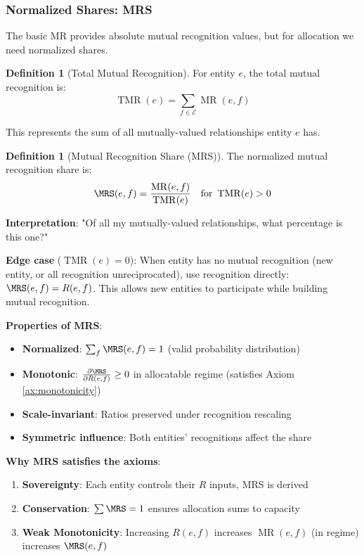 \documentclass[11pt,a4paper]{article}
\theoremstyle{definition}
\newtheorem{definition}[theorem]{Definition}
\theoremstyle{remark}
\newcommand{\E}{\mathcal{E}}
\DeclareMathOperator{\MR}{MR}
\DeclareMathOperator{\TMR}{TMR}
\begin{document}
\subsubsection{Normalized Shares: MRS}

The basic MR provides absolute mutual recognition values, but for allocation we need normalized shares.

\begin{definition}[Total Mutual Recognition]
For entity $e$, the total mutual recognition is:
\[ \TMR(e) = \sum_{f \in \E} \MR(e,f) \]

This represents the sum of all mutually-valued relationships entity $e$ has.
\end{definition}

\begin{definition}[Mutual Recognition Share (MRS)]
The normalized mutual recognition share is:
\[ \MRS(e,f) = \frac{\MR(e,f)}{\TMR(e)} \quad \text{for } \TMR(e) > 0 \]

\textbf{Interpretation}: "Of all my mutually-valued relationships, what percentage is this one?"

\textbf{Edge case} ($\TMR(e) = 0$): When entity has no mutual recognition (new entity, or all recognition unreciprocated), use recognition directly: $\MRS(e,f) = R(e,f)$. This allows new entities to participate while building mutual recognition.
\end{definition}

\textbf{Properties of MRS}:
\begin{itemize}
\item \textbf{Normalized}: $\sum_f \MRS(e,f) = 1$ (valid probability distribution)
\item \textbf{Monotonic}: $\frac{\partial \MRS}{\partial R(e,f)} \ge 0$ in allocatable regime (satisfies Axiom \ref{ax:monotonicity})
\item \textbf{Scale-invariant}: Ratios preserved under recognition rescaling
\item \textbf{Symmetric influence}: Both entities' recognitions affect the share
\end{itemize}

\textbf{Why MRS satisfies the axioms}:
\begin{enumerate}
\item \textbf{Sovereignty}: Each entity controls their $R$ inputs, MRS is derived
\item \textbf{Conservation}: $\sum \MRS = 1$ ensures allocation sums to capacity
\item \textbf{Weak Monotonicity}: Increasing $R(e,f)$ increases $\MR(e,f)$ (in regime) increases $\MRS(e,f)$
\end{enumerate}
\end{document}
